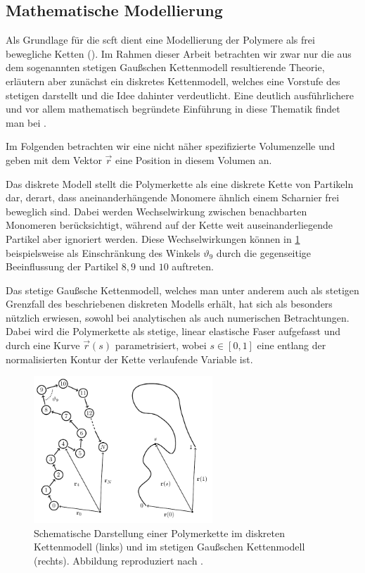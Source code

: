 \documentclass[../main.tex]{subfiles}
\begin{document}
\subsection*{Mathematische Modellierung} %

Als Grundlage für die \acl{scft} dient eine Modellierung der Polymere als frei bewegliche Ketten ().
Im Rahmen dieser Arbeit betrachten wir zwar nur die aus dem sogenannten stetigen Gaußschen Kettenmodell resultierende Theorie, erläutern aber zunächst ein diskretes Kettenmodell, welches eine Vorstufe des stetigen darstellt und die Idee dahinter verdeutlicht.
Eine deutlich ausführlichere und vor allem mathematisch begründete Einführung in diese Thematik findet man bei \textcites[Chapter 2]{Fredrickson:2006th}{rubinstein2003polymer}.

Im Folgenden betrachten wir eine nicht näher spezifizierte Volumenzelle und geben mit dem Vektor $\vec{r}$ eine Position in diesem Volumen an.

Das diskrete Modell stellt die Polymerkette als eine diskrete Kette von Partikeln dar, derart, dass aneinanderhängende Monomere ähnlich einem Scharnier frei beweglich sind.
Dabei werden Wechselwirkung zwischen benachbarten Monomeren berücksichtigt, während auf der Kette weit auseinanderliegende Partikel aber ignoriert werden.
Diese Wechselwirkungen können in \cref{figure:kettenmodelle} beispielsweise als Einschränkung des Winkels $\vartheta_9$ durch die gegenseitige Beeinflussung der Partikel $8, 9$ und $10$ auftreten.

Das stetige Gaußsche Kettenmodell, welches man unter anderem auch als stetigen Grenzfall des beschriebenen diskreten Modells erhält, hat sich als besonders nützlich erwiesen, sowohl bei analytischen als auch numerischen Betrachtungen.
Dabei wird die Polymerkette als stetige, linear elastische Faser aufgefasst und durch eine Kurve $\vec{r}(s)$ parametrisiert, wobei $s \in [0, 1]$ eine entlang der normalisierten Kontur der Kette verlaufende Variable ist.

\begin{figure}[tb]
    \centering
        \includegraphics[width=0.6\textwidth]{figures/einleitung/chainmodell.pdf}
    \caption[%
        Polymerkette in diskretem und Gaußschen Kettenmodell
    ]{%
        Schematische Darstellung einer Polymerkette im diskreten Kettenmodell (links) und im stetigen Gaußschen Kettenmodell (rechts).
        Abbildung reproduziert nach \cite[Figure 2.1 und 2.5]{Fredrickson:2006th}.
    }
    \label{figure:kettenmodelle}
\end{figure}
\end{document}
